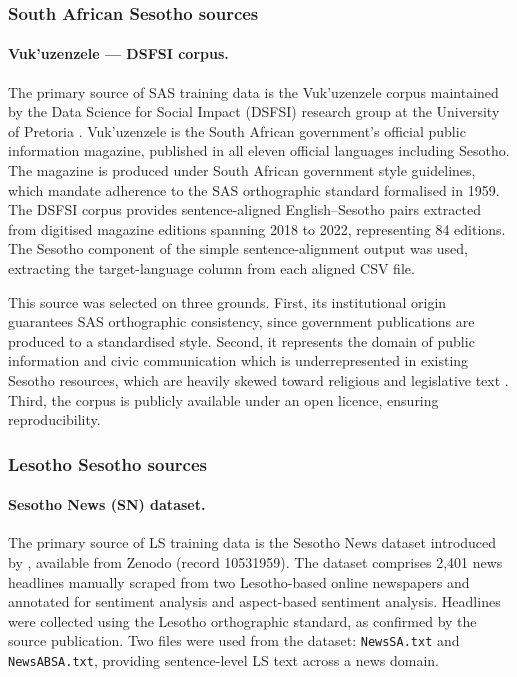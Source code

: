 \documentclass[11pt,a4paper]{article}
\begin{document}
\subsubsection{South African Sesotho sources}

\paragraph{Vuk'uzenzele — DSFSI corpus.}
The primary source of SAS training data is the Vuk'uzenzele corpus maintained
by the Data Science for Social Impact (DSFSI) research group at the University
of Pretoria \citep{marivate2020investigating}. Vuk'uzenzele is the South African
government's official public information magazine, published in all eleven
official languages including Sesotho. The magazine is produced under South
African government style guidelines, which mandate adherence to the SAS
orthographic standard formalised in 1959. The DSFSI corpus provides
sentence-aligned English--Sesotho pairs extracted from digitised magazine
editions spanning 2018 to 2022, representing 84 editions. The Sesotho component
of the simple sentence-alignment output was used, extracting the target-language
column from each aligned CSV file.

This source was selected on three grounds. First, its institutional origin
guarantees SAS orthographic consistency, since government publications are
produced to a standardised style. Second, it represents the domain of public
information and civic communication which is underrepresented in existing
Sesotho resources, which are heavily skewed toward religious and legislative
text \citep{kwon2026afroscope}. Third, the corpus is publicly available under an
open licence, ensuring reproducibility.

\subsubsection{Lesotho Sesotho sources}

\paragraph{Sesotho News (SN) dataset.}
The primary source of LS training data is the Sesotho News dataset introduced
by \citet{mokhosi2024sesotho}, available from Zenodo (record 10531959). The
dataset comprises 2,401 news headlines manually scraped from two Lesotho-based
online newspapers and annotated for sentiment analysis and aspect-based sentiment
analysis. Headlines were collected using the Lesotho orthographic standard, as
confirmed by the source publication. Two files were used from the dataset:
\texttt{NewsSA.txt} and \texttt{NewsABSA.txt}, providing sentence-level LS text
across a news domain.
\end{document}
